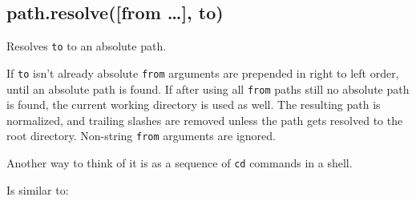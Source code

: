 \begin{Shaded}
\begin{Highlighting}[]
\NormalTok{(}\NormalTok{, }\NormalTok{, }\NormalTok{, }\NormalTok{, }\NormalTok{)}

\NormalTok{(}\NormalTok{, \{\}, }\NormalTok{)}
   
\end{Highlighting}
\end{Shaded}

\subsection{path.resolve({[}from \ldots{}{]},
to)}\label{path.resolvefrom-to}

Resolves \texttt{to} to an absolute path.

If \texttt{to} isn't already absolute \texttt{from} arguments are
prepended in right to left order, until an absolute path is found. If
after using all \texttt{from} paths still no absolute path is found, the
current working directory is used as well. The resulting path is
normalized, and trailing slashes are removed unless the path gets
resolved to the root directory. Non-string \texttt{from} arguments are
ignored.

Another way to think of it is as a sequence of \texttt{cd} commands in a
shell.

\begin{Shaded}
\begin{Highlighting}[]
\NormalTok{(}\NormalTok{, }\NormalTok{, }\NormalTok{, }\NormalTok{)}
\end{Highlighting}
\end{Shaded}

Is similar to:

\begin{Shaded}
\begin{Highlighting}[]
 
\end{Highlighting}
\end{Shaded}

